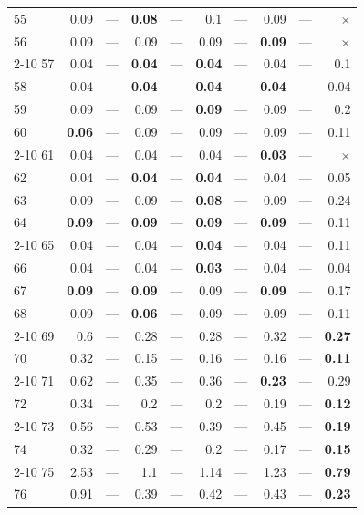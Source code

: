 \begin{longtable}{lr@{\hskip 4pt}l@{\hskip 12pt}r@{\hskip 4pt}l@{\hskip 12pt}r@{\hskip 4pt}l@{\hskip 12pt}r@{\hskip 4pt}l@{\hskip 12pt}r}
55 & 0.09 & --- & \textbf{0.08} & --- & 0.1 & --- & 0.09 & --- & $\times$ \\
56 & 0.09 & --- & 0.09 & --- & 0.09 & --- & \textbf{0.09} & --- & $\times$ \\
\cmidrule{2-10}
57 & 0.04 & --- & \textbf{0.04} & --- & \textbf{0.04} & --- & 0.04 & --- & 0.1 \\
58 & 0.04 & --- & \textbf{0.04} & --- & \textbf{0.04} & --- & \textbf{0.04} & --- & 0.04 \\
59 & 0.09 & --- & 0.09 & --- & \textbf{0.09} & --- & 0.09 & --- & 0.2 \\
60 & \textbf{0.06} & --- & 0.09 & --- & 0.09 & --- & 0.09 & --- & 0.11 \\
\cmidrule{2-10}
61 & 0.04 & --- & 0.04 & --- & 0.04 & --- & \textbf{0.03} & --- & $\times$ \\
62 & 0.04 & --- & \textbf{0.04} & --- & \textbf{0.04} & --- & 0.04 & --- & 0.05 \\
63 & 0.09 & --- & 0.09 & --- & \textbf{0.08} & --- & 0.09 & --- & 0.24 \\
64 & \textbf{0.09} & --- & \textbf{0.09} & --- & \textbf{0.09} & --- & \textbf{0.09} & --- & 0.11 \\
\cmidrule{2-10}
65 & 0.04 & --- & 0.04 & --- & \textbf{0.04} & --- & 0.04 & --- & 0.11 \\
66 & 0.04 & --- & 0.04 & --- & \textbf{0.03} & --- & 0.04 & --- & 0.04 \\
67 & \textbf{0.09} & --- & \textbf{0.09} & --- & 0.09 & --- & \textbf{0.09} & --- & 0.17 \\
68 & 0.09 & --- & \textbf{0.06} & --- & 0.09 & --- & 0.09 & --- & 0.11 \\
\cmidrule{2-10}
69 & 0.6 & --- & 0.28 & --- & 0.28 & --- & 0.32 & --- & \textbf{0.27} \\
70 & 0.32 & --- & 0.15 & --- & 0.16 & --- & 0.16 & --- & \textbf{0.11} \\
\cmidrule{2-10}
71 & 0.62 & --- & 0.35 & --- & 0.36 & --- & \textbf{0.23} & --- & 0.29 \\
72 & 0.34 & --- & 0.2 & --- & 0.2 & --- & 0.19 & --- & \textbf{0.12} \\
\cmidrule{2-10}
73 & 0.56 & --- & 0.53 & --- & 0.39 & --- & 0.45 & --- & \textbf{0.19} \\
74 & 0.32 & --- & 0.29 & --- & 0.2 & --- & 0.17 & --- & \textbf{0.15} \\
\cmidrule{2-10}
75 & 2.53 & --- & 1.1 & --- & 1.14 & --- & 1.23 & --- & \textbf{0.79} \\
76 & 0.91 & --- & 0.39 & --- & 0.42 & --- & 0.43 & --- & \textbf{0.23} \\

\end{longtable}
